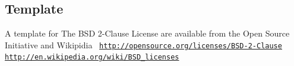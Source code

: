 \hypertarget{license_page_license_tem}{}\subsection{Template}\label{license_page_license_tem}
A template for The B\+SD 2-\/\+Clause License are available from the Open Source Initiative and Wikipidia~\newline
 \href{http://opensource.org/licenses/BSD-2-Clause}{\tt http\+://opensource.\+org/licenses/\+B\+S\+D-\/2-\/\+Clause}~\newline
 \href{http://en.wikipedia.org/wiki/BSD_licenses}{\tt http\+://en.\+wikipedia.\+org/wiki/\+B\+S\+D\+\_\+licenses}~\newline
 